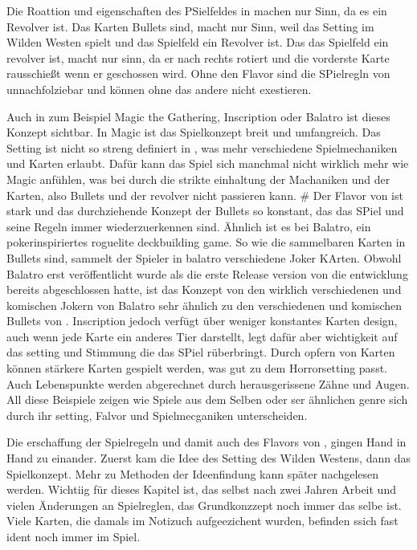 Die Roattion und eigenschaften des PSielfeldes in \FF machen nur Sinn, da es ein Revolver ist.
Das Karten Bullets sind, macht nur Sinn, weil das Setting im Wilden Westen spielt und das Spielfeld ein Revolver ist.
Das das Spielfeld ein revolver ist, macht nur sinn, da er nach rechts rotiert und die vorderste Karte rausschießt wenn er geschossen wird.
Ohne den Flavor sind die SPielregln von \FF unnachfolziebar und können ohne das andere nicht exestieren.

Auch in zum Beispiel Magic the Gathering, Inscription oder Balatro ist dieses Konzept sichtbar. In Magic ist das Spielkonzept breit und umfangreich. Das Setting ist nicht so streng definiert in \FF, was mehr verschiedene Spielmechaniken und Karten erlaubt. Dafür kann das Spiel sich manchmal nicht wirklich mehr wie Magic anfühlen,
was bei \FF durch die strikte einhaltung der Machaniken und der Karten, also  Bullets und der revolver nicht passieren kann. #
Der Flavor von \FF ist stark und das durchziehende Konzept der Bullets so konstant, das das SPiel und seine Regeln immer
wiederzuerkennen sind. Ähnlich ist es bei Balatro, ein pokerinspiriertes roguelite deckbuilding game.
So wie die sammelbaren Karten in \FF Bullets sind, sammelt der Spieler in balatro verschiedene Joker KArten.
Obwohl Balatro erst veröffentlicht wurde als die erste Release version von \FF die entwicklung bereits abgeschlossen hatte,
ist das Konzept von den wirklich verschiedenen und komischen Jokern von Balatro sehr ähnlich zu den verschiedenen und
komischen Bullets von \FF.
Inscription jedoch verfügt über weniger konstantes Karten design, auch wenn jede Karte ein anderes Tier darstellt,
legt dafür aber wichtigkeit auf das setting und Stimmung die das SPiel rüberbringt. Durch opfern von Karten können stärkere Karten
gespielt werden, was gut zu dem Horrorsetting passt. Auch Lebenspunkte werden abgerechnet durch herausgerissene Zähne und Augen.
All diese Beispiele zeigen wie Spiele aus dem Selben oder ser ähnlichen genre sich durch ihr setting, Falvor und Spielmecganiken unterscheiden.


Die erschaffung der Spielregeln und damit auch des Flavors von \FF, gingen Hand in Hand zu einander.
Zuerst kam die Idee des Setting des Wilden Westens, dann das Spielkonzept.
Mehr zu Methoden der Ideenfindung kann später nachgelesen werden. Wichtiig für dieses Kapitel ist,
das selbst nach zwei Jahren Arbeit und vielen Änderungen an Spielreglen, das Grundkonzzept noch immer das selbe ist.
Viele Karten, die damals im Notizuch aufgeezichent wurden, befinden ssich fast ident noch immer im Spiel.



